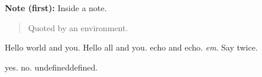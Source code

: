 \documentclass{article}
\newenvironment{note}[1]{\par\textbf{Note (#1):} }{\par}
\newenvironment{shout}{\begin{quote}}{\end{quote}}
\newcommand{\greet}[2][world]{Hello #1 and #2}
\def\twice#1{#1 and #1}
\let\emphasis\emph
\providecommand{\once}{once}
\renewcommand{\once}{twice}
\begin{document}
\begin{note}{first}
Inside a note.
\end{note}
\begin{shout}
Quoted by an environment.
\end{shout}
\greet{you}. \greet[all]{you}. \twice{echo}. \emphasis{em}. Say \once.

\newif\ifflag
\flagtrue
\ifflag yes\else no\fi. \flagfalse \ifflag yes\else no\fi.
\ifx\undefinedmacro\relax undefined\else defined\fi.
\end{document}
